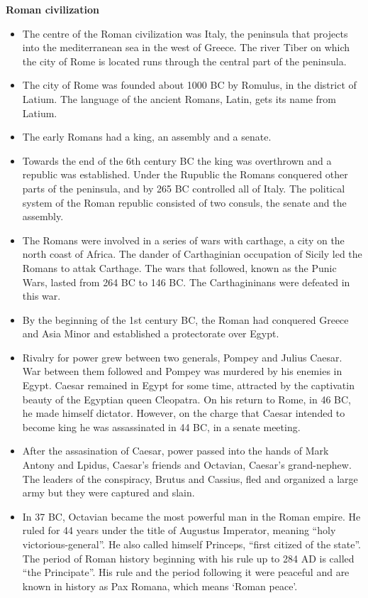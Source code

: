 \documentclass[
  openany]{book}
\providecommand{\tightlist}{%
  \setlength{\itemsep}{0pt}\setlength{\parskip}{0pt}}
\begin{document}
\textbf{Roman civilization}

\begin{itemize}
\tightlist
\item
  The centre of the Roman civilization was Italy, the peninsula that projects into the mediterranean sea in the west of Greece. The river Tiber on which the city of Rome is located runs through the central part of the peninsula.
\item
  The city of Rome was founded about 1000 BC by Romulus, in the district of Latium. The language of the ancient Romans, Latin, gets its name from Latium.
\item
  The early Romans had a king, an assembly and a senate.
\item
  Towards the end of the 6th century BC the king was overthrown and a republic was established. Under the Rupublic the Romans conquered other parts of the peninsula, and by 265 BC controlled all of Italy. The political system of the Roman republic consisted of two consuls, the senate and the assembly.
\item
  The Romans were involved in a series of wars with carthage, a city on the north coast of Africa. The dander of Carthaginian occupation of Sicily led the Romans to attak Carthage. The wars that followed, known as the Punic Wars, lasted from 264 BC to 146 BC. The Carthagininans were defeated in this war.
\item
  By the beginning of the 1st century BC, the Roman had conquered Greece and Asia Minor and established a protectorate over Egypt.
\item
  Rivalry for power grew between two generals, Pompey and Julius Caesar. War between them followed and Pompey was murdered by his enemies in Egypt. Caesar remained in Egypt for some time, attracted by the captivatin beauty of the Egyptian queen Cleopatra. On his return to Rome, in 46 BC, he made himself dictator. However, on the charge that Caesar intended to become king he was assassinated in 44 BC, in a senate meeting.
\item
  After the assasination of Caesar, power passed into the hands of Mark Antony and Lpidus, Caesar's friends and Octavian, Caesar's grand-nephew. The leaders of the conspiracy, Brutus and Cassius, fled and organized a large army but they were captured and slain.
\item
  In 37 BC, Octavian became the most powerful man in the Roman empire. He ruled for 44 years under the title of Augustus Imperator, meaning ``holy victorious-general''. He also called himself Princeps, ``first citized of the state''. The period of Roman history beginning with his rule up to 284 AD is called ``the Principate''. His rule and the period following it were peaceful and are known in history as Pax Romana, which means `Roman peace'.

\end{itemize}
\end{document}
